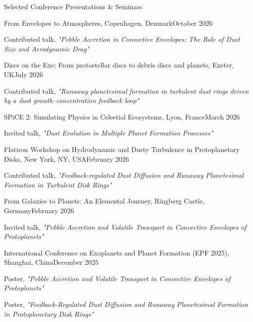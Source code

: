 \documentclass{resume} %
\begin{document}
\begin{rSection}{Selected Conference Presentations \& Seminars} \itemsep -2pt
\begin{rSubsection}{From Envelopes to Atmospheres, Copenhagen, Denmark}{October 2026}{}{}
\item Contributed talk, \emph{"Pebble Accretion in Convective Envelopes: The Role of Dust Size and Aerodynamic Drag"}
\end{rSubsection}

\begin{rSubsection}{Discs on the Exe: From protostellar discs to debris discs and planets, Exeter, UK}{July 2026}{}{}
\item Contributed talk, \emph{"Runaway planetesimal formation in turbulent dust rings driven by a dust growth--concentration feedback loop"}
\end{rSubsection}

\begin{rSubsection}{SPiCE 2: Simulating Physics in Celestial Ecosystems, Lyon, France}{March 2026}{}{}
\item Invited talk, \emph{"Dust Evolution in Multiple Planet Formation Processes"}
\end{rSubsection}

\begin{rSubsection}{Flatiron Workshop on Hydrodynamic and Dusty Turbulence in Protoplanetary Disks, New York, NY, USA}{February 2026}{}{}
\item Contributed talk, \emph{"Feedback-regulated Dust Diffusion and Runaway Planetesimal Formation in Turbulent Disk Rings"}
\end{rSubsection}

\begin{rSubsection}{From Galaxies to Planets: An Elemental Journey, Ringberg Castle, Germany}{February 2026}{}{}
\item Invited talk, \emph{"Pebble Accretion and Volatile Transport in Convective Envelopes of Protoplanets"}
\end{rSubsection}

\begin{rSubsection}{International Conference on Exoplanets and Planet Formation (EPF 2025), Shanghai, China}{December 2025}{}{}
\item Poster, \emph{"Pebble Accretion and Volatile Transport in Convective Envelopes of Protoplanets"}
\item Poster, \emph{"Feedback-Regulated Dust Diffusion and Runaway Planetesimal Formation in Protoplanetary Disk Rings"}
\end{rSubsection}


\end{rSection}
\end{document}
